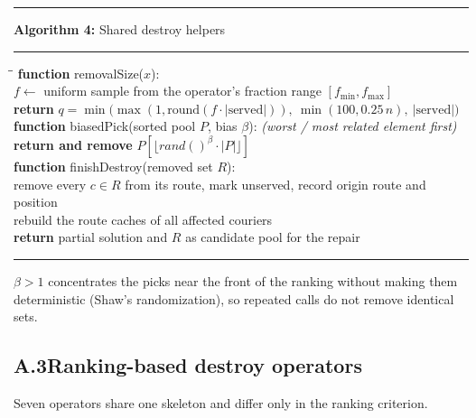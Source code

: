 \documentclass[10pt, a4paper]{article}
\begin{document}
\begin{center}
\begin{minipage}{0.92\linewidth}
\small
\hrule\vspace{2pt}
\textbf{Algorithm 4:} Shared destroy helpers
\vspace{2pt}\hrule\vspace{4pt}
\begin{tabbing}
\hspace{1.2em}\=\hspace{1.2em}\=\kill
\textbf{function} removalSize($x$):\\
\>$f \leftarrow$ uniform sample from the operator's fraction range
  $[f_{\min}, f_{\max}]$\\
\>\textbf{return} $q = \min\bigl(\max(1, \text{round}(f \cdot
  |\text{served}|)),\ \min(100, 0.25\,n),\ |\text{served}|\bigr)$\\[3pt]
\textbf{function} biasedPick(sorted pool $P$, bias $\beta$):
  \quad\emph{(worst / most related element first)}\\
\>\textbf{return and remove} $P[\lfloor \mathit{rand}()^{\beta}
  \cdot |P| \rfloor]$\\[3pt]
\textbf{function} finishDestroy(removed set $R$):\\
\>remove every $c \in R$ from its route, mark unserved, record origin
  route and position\\
\>rebuild the route caches of all affected couriers\\
\>\textbf{return} partial solution and $R$ as candidate pool for the repair
\end{tabbing}
\vspace{2pt}\hrule
\end{minipage}
\end{center}

$\beta > 1$ concentrates the picks near the front of the ranking without
making them deterministic (Shaw's randomization), so repeated calls do not
remove identical sets.

\subsection*{A.3\quad Ranking-based destroy operators}

Seven operators share one skeleton and differ only in the ranking
criterion.
\end{document}
